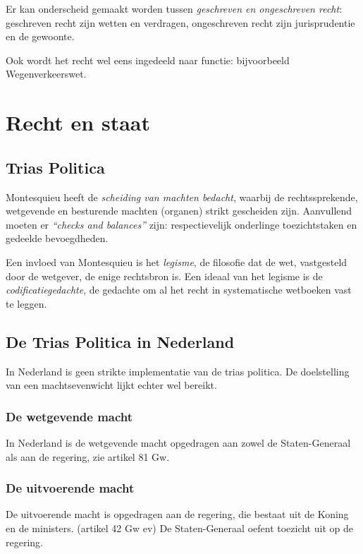 \documentclass{article}
\begin{document}
Er kan onderscheid gemaakt worden tussen \emph{geschreven en ongeschreven recht}:
geschreven recht zijn wetten en verdragen, ongeschreven recht zijn
jurisprudentie en de gewoonte. 

Ook wordt het recht wel eens ingedeeld naar functie: bijvoorbeeld
Wegenverkeerswet.

\section{Recht en staat}
\label{h2}

\subsection{Trias Politica}

Montesquieu heeft de \emph{scheiding van machten bedacht}, waarbij de
rechtssprekende, wetgevende en besturende machten (organen) strikt gescheiden
zijn. Aanvullend moeten er \emph{``checks and balances''} zijn: respectievelijk
onderlinge toezichtstaken en gedeelde bevoegdheden. 

Een invloed van Montesquieu is het \emph{legisme}, de filosofie dat de wet,
vastgesteld door de wetgever, de enige rechtsbron is. Een ideaal van het
legisme is de \emph{codificatiegedachte}, de gedachte om al het recht in
systematische wetboeken vast te leggen.

\subsection{De Trias Politica in Nederland}

In Nederland is geen strikte implementatie van de trias politica. De
doelstelling van een machtsevenwicht lijkt echter wel bereikt.

\subsubsection{De wetgevende macht}
 
In Nederland is de wetgevende macht opgedragen aan zowel de Staten-Generaal
als aan de regering, zie artikel 81 Gw. 

\subsubsection{De uitvoerende macht}

De uitvoerende macht is opgedragen aan de regering, die bestaat uit de Koning
en de ministers. (artikel 42 Gw ev) De Staten-Generaal oefent toezicht uit op
de regering. 
\end{document}
